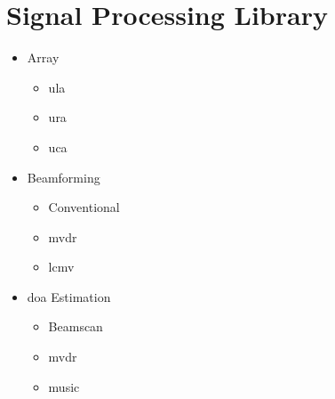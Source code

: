 \chapter{Signal Processing Library} \label{ch: signal-processing-library}

\begin{itemize}
	\item Array
	\begin{itemize}
		\item \acf{ula}
		\item \acf{ura}
		\item \acf{uca}
	\end{itemize}
	\item Beamforming
	\begin{itemize}
		\item Conventional
		\item \ac{mvdr}
		\item \ac{lcmv}
	\end{itemize}
	\item \acf{doa} Estimation
	\begin{itemize}
		\item Beamscan	
		\item \ac{mvdr}
		\item \ac{music}
	\end{itemize}
\end{itemize}
